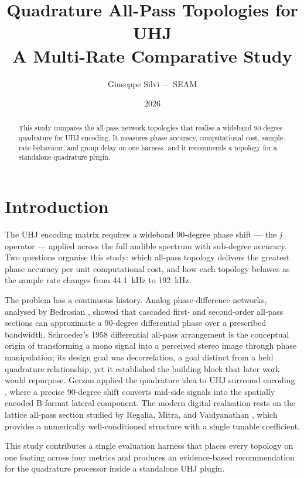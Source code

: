 \documentclass[11pt,a4paper]{article}
\title{Quadrature All-Pass Topologies for UHJ\\\large A Multi-Rate Comparative Study}
\author{Giuseppe Silvi --- SEAM}
\date{2026}
\begin{document}
\maketitle
\begin{abstract}
This study compares the all-pass network topologies that realise a wideband 90-degree quadrature for UHJ encoding.
It measures phase accuracy, computational cost, sample-rate behaviour, and group delay on one harness, and it recommends a topology for a standalone quadrature plugin.
\end{abstract}
\tableofcontents

\section{Introduction}

The UHJ encoding matrix requires a wideband 90-degree phase shift — the
\emph{j} operator — applied across the full audible spectrum with sub-degree
accuracy.
Two questions organise this study: which all-pass topology delivers the
greatest phase accuracy per unit computational cost, and how each topology
behaves as the sample rate changes from \SI{44.1}{\kilo\hertz} to
\SI{192}{\kilo\hertz}.

The problem has a continuous history.
Analog phase-difference networks, analysed by Bedrosian \cite{Bedrosian1960},
showed that cascaded first- and second-order all-pass sections can approximate
a 90-degree differential phase over a prescribed bandwidth.
Schroeder's 1958 differential all-pass arrangement is the conceptual origin of
transforming a mono signal into a perceived stereo image through phase
manipulation; its design goal was decorrelation, a goal distinct from a held quadrature
relationship, yet it established the building block that later work would
repurpose.
Gerzon applied the quadrature idea to UHJ surround encoding
\cite{gerzon1983broadcast}, where a precise 90-degree shift converts
mid-side signals into the spatially encoded B-format lateral component.
The modern digital realisation rests on the lattice all-pass section studied by
Regalia, Mitra, and Vaidyanathan \cite{RegaliaMitraVaidyanathan1988}, which
provides a numerically well-conditioned structure with a single tunable
coefficient.

This study contributes a single evaluation harness that places every topology
on one footing across four metrics and produces an evidence-based
recommendation for the quadrature processor inside a standalone UHJ plugin.
\end{document}
